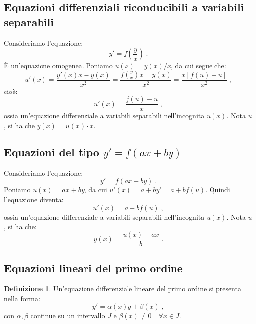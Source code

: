 \documentclass[a4paper,12pt]{report}
\theoremstyle{plain}
\theoremstyle{definition}
\newtheorem{defn}{Definizione}[section]
\theoremstyle{remark}
\numberwithin{equation}{section}
\begin{document}
\subsection{Equazioni differenziali riconducibili a variabili separabili}
Consideriamo l'equazione:
\begin{equation}
y'=f\left(\frac{y}{x}\right)\;.
\end{equation}
È un'equazione omogenea. Poniamo $u(x)=y(x)/x$, da cui segue che:
\begin{equation}
u'(x)=\frac{y'(x)x-y(x)}{x^2}=\frac{f\left(\frac{y}{x}\right)x-y(x)}{x^2}=\frac{x[f(u)-u]}{x^2}\;,
\end{equation}
cioè:
\begin{equation}
u'(x)=\frac{f(u)-u}{x}\;,
\end{equation}
ossia un'equazione differenziale a variabili separabili nell'incognita $u(x)$. Nota $u$, si ha che $y(x)=u(x)\cdot x$.
\subsection{Equazioni del tipo $y'=f(ax+by)$}
Consideriamo l'equazione:
\begin{equation}
y'=f(ax+by)\;.
\end{equation}
Poniamo $u(x)=ax+by$, da cui $u'(x)=a+by'=a+bf(u)$. Quindi l'equazione diventa:
\begin{equation}
u'(x)=a+bf(u)\;,
\end{equation}
ossia un'equazione differenziale a variabili separabili nell'incognita $u(x)$. Nota $u$, si ha che:
\begin{equation}
y(x)=\frac{u(x)-ax}{b}\;.
\end{equation}
\subsection{Equazioni lineari del primo ordine}
\begin{defn} Un'equazione differenziale lineare del primo ordine si presenta nella forma:
\begin{equation}
y'=\alpha(x)y+\beta(x)\;,
\end{equation}
con $\alpha,\beta$ continue su un intervallo $J$ e $\beta(x) \ne 0 \quad \forall x \in J$.
\end{defn}
\end{document}

